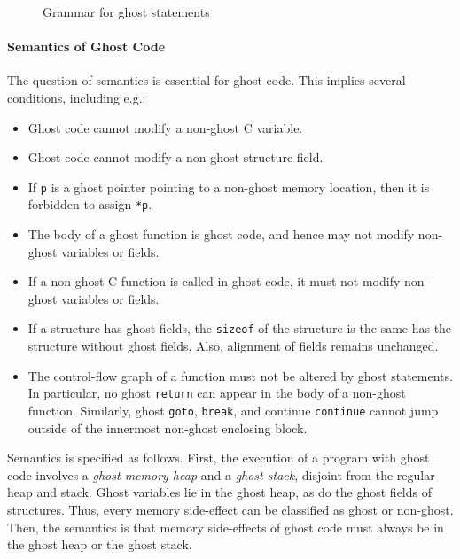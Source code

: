 \begin{figure}[t]
  \begin{cadre}
      
    \end{cadre}
  \caption{Grammar for ghost statements}
\label{fig:gram:ghost}
\end{figure}


\paragraph{Semantics of Ghost Code}
\label{sec:semantics-ghost-code}
The question of semantics is essential for ghost code.
 This implies several conditions, including e.g.:
\begin{itemize}
\item Ghost code cannot modify a non-ghost C variable.
\item Ghost code cannot modify a non-ghost structure field.
\item If \lstinline|p| is a ghost pointer pointing to a non-ghost
  memory location, then it is forbidden to assign \lstinline|*p|.
\item The body of a ghost function is ghost code, and hence may not modify
  non-ghost variables or fields.
\item If a non-ghost C function is called in ghost code, it must not
  modify non-ghost variables or fields.
\item If a structure has ghost fields, the \lstinline|sizeof| of the
  structure is the same has the structure without ghost fields. Also,
  alignment of fields remains unchanged.
\item The control-flow graph of a function must not be altered by
  ghost statements. In particular, no ghost \lstinline|return| can appear
  in the body of a non-ghost function. Similarly, ghost
  \lstinline|goto|, \lstinline|break|, and continue
  \lstinline|continue| cannot jump
  outside of the innermost non-ghost enclosing block.
\end{itemize}

Semantics is specified as follows. First, the
execution of a program with ghost code involves a \emph{ghost memory heap}
and a \emph{ghost stack}, disjoint from the regular heap and stack.
Ghost variables lie in the ghost heap, as do the ghost fields of
structures. Thus, every memory side-effect can be classified as ghost
or non-ghost. Then, the semantics is that memory side-effects of ghost
code must always be in the ghost heap or the ghost stack.

